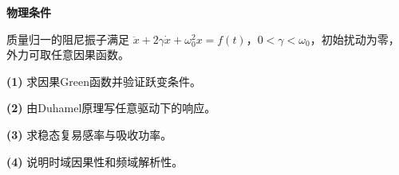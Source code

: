 \textbf{物理条件}\par 质量归一的阻尼振子满足 \(\ddot x+2\gamma\dot x+\omega_0^2x=f(t)\)，\(0<\gamma<\omega_0\)，初始扰动为零，外力可取任意因果函数。
\par\noindent\textbf{(1)} 求因果Green函数并验证跃变条件。
\par\noindent\textbf{(2)} 由Duhamel原理写任意驱动下的响应。
\par\noindent\textbf{(3)} 求稳态复易感率与吸收功率。
\par\noindent\textbf{(4)} 说明时域因果性和频域解析性。
